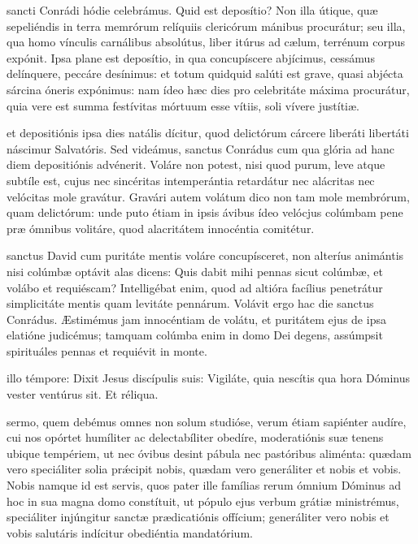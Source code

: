 \documentclass[fontsize=9pt,paper=A6,twoside,BCOR=1mm,DIV=22,headinclude]{scrarticle}
\begin{document}
\begin{multicols}{2}
 sancti Conrádi hódie celebrámus. Quid est deposítio? Non illa útique, quæ sepeliéndis in terra memrórum relíquiis clericórum mánibus procurátur; seu illa, qua homo vínculis carnálibus absolútus, liber itúrus ad cælum, terrénum corpus expónit. Ipsa plane est deposítio, in qua concupíscere abjícimus, cessámus delínquere, peccáre desínimus: et totum quidquid salúti est grave, quasi abjécta sárcina óneris expónimus: nam ídeo hæc dies pro celebritáte máxima procurátur, quia vere est summa festívitas mórtuum esse vítiis, soli vívere justítiæ.

\RVCPiv 

 et depositiónis ipsa dies natális dícitur, quod delictórum cárcere liberáti libertáti náscimur Salvatóris. Sed videámus, sanctus Conrádus cum qua glória ad hanc diem depositiónis advénerit. Voláre non potest, nisi quod purum, leve atque subtíle est, cujus nec sincéritas intemperántia retardátur nec alácritas nec velócitas mole gravátur. Gravári autem volátum dico non tam mole membrórum, quam delictórum: unde puto étiam in ipsis ávibus ídeo velócjus colúmbam pene præ ómnibus volitáre, quod alacritátem innocéntia comitétur.

\RVCPv 

 sanctus David cum puritáte mentis voláre concupísceret, non alteríus animántis nisi colúmbæ optávit alas dicens: Quis dabit mihi pennas sicut colúmbæ, et volábo et requiéscam? Intelligébat enim, quod ad altióra facílius penetrátur simplicitáte mentis quam levitáte pennárum. Volávit ergo hac die sanctus Conrádus. Æstimémus jam innocéntiam de volátu, et puritátem ejus de ipsa elatióne judicémus; tamquam colúmba enim in domo Dei degens, assúmpsit spirituáles pennas et requiévit in monte.

\RVCPvi 


{
 illo témpore: Dixit Jesus discípulis suis: Vigiláte, quia nescítis qua hora Dóminus vester ventúrus sit. Et réliqua.

 sermo, quem debémus omnes non solum studióse, verum étiam sapiénter audíre, cui nos opórtet humíliter ac delectabíliter obedíre, moderatiónis suæ tenens ubique tempériem, ut nec óvibus desint pábula nec pastóribus aliménta: quædam vero speciáliter solia pr\'æcipit nobis, quædam vero generáliter et nobis et vobis. Nobis namque id est servis, quos pater ille famílias rerum ómnium Dóminus ad hoc in sua magna domo constítuit, ut pópulo ejus verbum grátiæ ministrémus, speciáliter injúngitur sanctæ prædicatiónis offícium; generáliter vero nobis et vobis salutáris indícitur obediéntia mandatórium.

}
\end{multicols}
\end{document}

